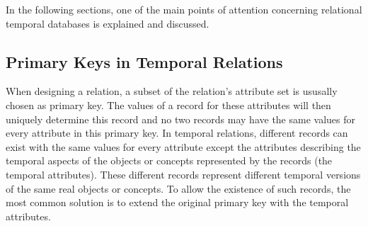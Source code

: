 
	
	
	


In the following sections, one of the main points of attention concerning relational temporal databases is explained and discussed.

\subsection{\label{subsubsec:primary-key}Primary Keys in Temporal Relations}
When designing a relation, a subset of the relation's attribute set is ususally chosen as primary key. The values of a record for these attributes will then uniquely determine this record and no two records may have the same values for every attribute in this primary key. In temporal relations, different records can exist with the same values for every attribute except the attributes describing the temporal aspects of the objects or concepts represented by the records (the temporal attributes). These different records represent different temporal versions of the same real objects or concepts. To allow the existence of such records, the most common solution is to extend the original primary key with the temporal attributes.

